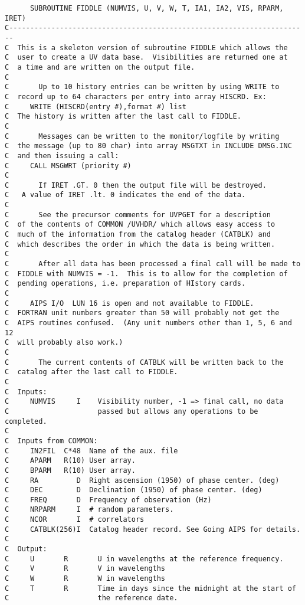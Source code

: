 \begin{verbatim}
      SUBROUTINE FIDDLE (NUMVIS, U, V, W, T, IA1, IA2, VIS, RPARM, IRET)
C-----------------------------------------------------------------------
C  This is a skeleton version of subroutine FIDDLE which allows the
C  user to create a UV data base.  Visibilities are returned one at
C  a time and are written on the output file.
C
C       Up to 10 history entries can be written by using WRITE to
C  record up to 64 characters per entry into array HISCRD. Ex:
C     WRITE (HISCRD(entry #),format #) list
C  The history is written after the last call to FIDDLE.
C
C       Messages can be written to the monitor/logfile by writing
C  the message (up to 80 char) into array MSGTXT in INCLUDE DMSG.INC
C  and then issuing a call:
C     CALL MSGWRT (priority #)
C
C       If IRET .GT. 0 then the output file will be destroyed.
C   A value of IRET .lt. 0 indicates the end of the data.
C
C       See the precursor comments for UVPGET for a description
C  of the contents of COMMON /UVHDR/ which allows easy access to
C  much of the information from the catalog header (CATBLK) and
C  which describes the order in which the data is being written.
C
C       After all data has been processed a final call will be made to
C  FIDDLE with NUMVIS = -1.  This is to allow for the completion of
C  pending operations, i.e. preparation of HIstory cards.
C
C     AIPS I/O  LUN 16 is open and not available to FIDDLE.
C  FORTRAN unit numbers greater than 50 will probably not get the
C  AIPS routines confused.  (Any unit numbers other than 1, 5, 6 and 12
C  will probably also work.)
C
C       The current contents of CATBLK will be written back to the
C  catalog after the last call to FIDDLE.
C
C  Inputs:
C     NUMVIS     I    Visibility number, -1 => final call, no data
C                     passed but allows any operations to be completed.
C
C  Inputs from COMMON:
C     IN2FIL  C*48  Name of the aux. file
C     APARM   R(10) User array.
C     BPARM   R(10) User array.
C     RA         D  Right ascension (1950) of phase center. (deg)
C     DEC        D  Declination (1950) of phase center. (deg)
C     FREQ       D  Frequency of observation (Hz)
C     NRPARM     I  # random parameters.
C     NCOR       I  # correlators
C     CATBLK(256)I  Catalog header record. See Going AIPS for details.
C
C  Output:
C     U       R       U in wavelengths at the reference frequency.
C     V       R       V in wavelengths
C     W       R       W in wavelengths
C     T       R       Time in days since the midnight at the start of
C                     the reference date.

\end{verbatim}
